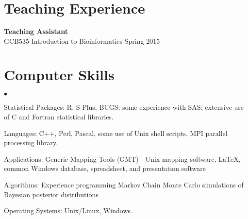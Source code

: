 \documentclass[margin,line]{res}
\newenvironment{list2}{
	\begin{list}{$\bullet$}{%
			\setlength{\itemsep}{0in}
			\setlength{\parsep}{0in} \setlength{\parskip}{0in}
			\setlength{\topsep}{0in} \setlength{\partopsep}{0in} 
			\setlength{\leftmargin}{0.2in}}}{\end{list}}
\begin{document}
\begin{resume}
		\section{\sc Teaching Experience}
		
		{\bf Teaching Assistant}\\
		GCB535 Introduction to Bioinformatics  \hfill {Spring 2015 }
		
		
		
		\section{\sc Computer Skills} 
		\begin{list2}
			\item Statistical Packages:  R, S-Plus, BUGS; some experience
			with SAS; extensive use of C and Fortran statistical libraries.
			\item Languages:  C++, Perl, Pascal, some use of Unix shell scripts,
			MPI parallel processing library.
			\item Applications: Generic Mapping Tools (GMT) - Unix mapping software, \LaTeX, common Windows
			database, spreadsheet, and presentation software
			\item Algorithms: Experience programming Markov Chain Monte Carlo
			simulations of Bayesian posterior distributions
			\item Operating Systems:  Unix/Linux, Windows.\\ 
		\end{list2}
		
		
		
	\end{resume}
\end{document}

